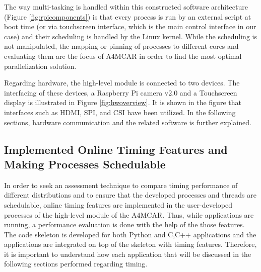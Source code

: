 The way multi-tasking is handled within this constructed software architecture (Figure \ref{fig:rpicomponents}) is that every process is run by an external script at boot time (or via touchscreen interface, which is the main control interface in our case) and their scheduling is handled by the Linux kernel. While the scheduling is not manipulated, the mapping or pinning of processes to different cores and evaluating them are the focus of A4MCAR in order to find the most optimal parallelization solution.

Regarding hardware, the high-level module is connected to two devices. The interfacing of these devices, a Raspberry Pi camera v2.0 and a Touchscreen display is illustrated in Figure \ref{fig:hwoverview}. It is shown in the figure that interfaces such as HDMI, SPI, and CSI have been utilized. In the following sections, hardware communication and the related software is further explained.
\subsection{Implemented Online Timing Features and Making Processes Schedulable} \label{onlinetiming}
In order to seek an assessment technique to compare timing performance of different distributions and to ensure that the developed processes and threads are schedulable, online timing features are implemented in the user-developed processes of the high-level module of the A4MCAR. Thus, while applications are running, a performance evaluation is done with the help of the those features. The code skeleton is developed for both Python and C,C++ applications and the applications are integrated on top of the skeleton with timing features. Therefore, it is important to understand how each application that will be discussed in the following sections performed regarding timing.

